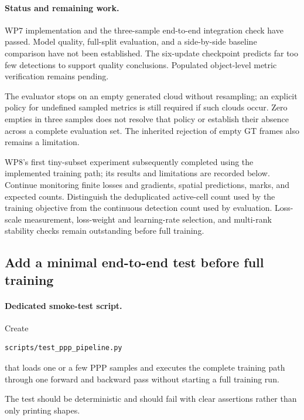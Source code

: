 \documentclass[11pt,a4paper]{article}
\begin{document}
\paragraph{Status and remaining work.}
WP7 implementation and the three-sample end-to-end integration check
have passed. Model quality, full-split evaluation, and a side-by-side
baseline comparison have not been established. The six-update checkpoint
predicts far too few detections to support quality conclusions.
Populated object-level metric verification remains pending.

The evaluator stops on an empty generated cloud without resampling;
an explicit policy for undefined sampled metrics is still required if
such clouds occur. Zero empties in three samples does not resolve that
policy or establish their absence across a complete evaluation set.
The inherited rejection of empty GT frames also remains a limitation.

WP8's first tiny-subset experiment subsequently completed using the
implemented training path; its results and limitations are recorded below.
Continue monitoring finite losses and gradients, spatial predictions,
marks, and expected counts. Distinguish the deduplicated active-cell count used
by the training objective from the continuous detection count used by
evaluation. Loss-scale measurement, loss-weight and learning-rate
selection, and multi-rank stability checks remain outstanding before
full training.

\subsection{Add a minimal end-to-end test before full training}

\paragraph{Dedicated smoke-test script.}
Create
\begin{lstlisting}
scripts/test_ppp_pipeline.py
\end{lstlisting}
that loads one or a few PPP samples and executes the complete training path through one forward and backward pass without starting a full training run.

The test should be deterministic and should fail with clear assertions rather than only printing shapes.
\end{document}

